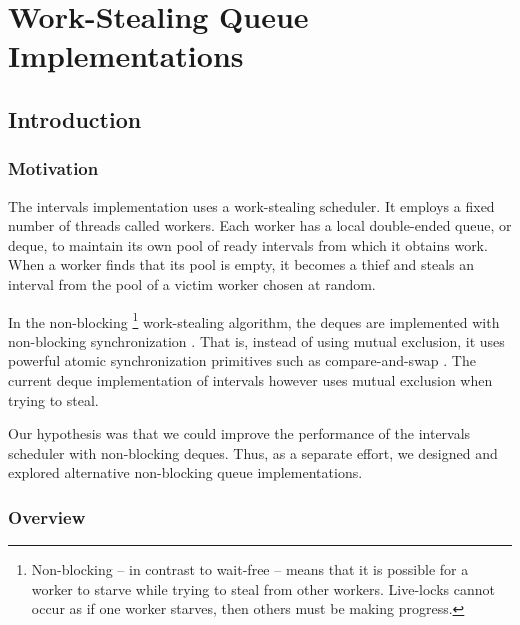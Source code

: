 
\part{Work-Stealing Queue Implementations}
\label{part:queues}

\chapter{Introduction}
\label{chap:queues-introduction}

\section{Motivation}
\label{sec:queues-intro-motivation}

The intervals implementation uses a work-stealing scheduler. It
employs a fixed number of threads called workers. Each worker has a
local double-ended queue, or deque, to maintain its own pool of ready
intervals from which it obtains work. When a worker finds that its
pool is empty, it becomes a thief and steals an interval from the pool
of a victim worker chosen at random.

In the non-blocking \footnote{Non-blocking -- in contrast to wait-free
  \cite{Herlihy1991} -- means that it is possible for a worker to
  starve while trying to steal from other workers. Live-locks cannot
  occur as if one worker starves, then others must be making
  progress.} work-stealing algorithm, the deques are implemented with
non-blocking synchronization \cite{Arora2001}. That is, instead of
using mutual exclusion, it uses powerful atomic synchronization
primitives such as compare-and-swap \cite{Moir1997}. The current deque
implementation of intervals however uses mutual exclusion when trying
to steal.

Our hypothesis was that we could improve the performance of the
intervals scheduler with non-blocking deques. Thus, as a separate
effort, we designed and explored alternative non-blocking queue
implementations.

\section{Overview}
\label{sec:queues-intro-overview}



